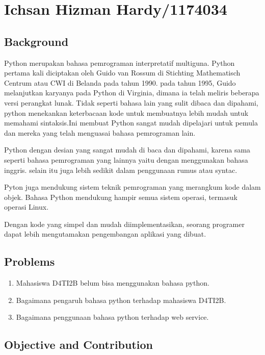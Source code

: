 \section{Ichsan Hizman Hardy/1174034}
\subsection{Background}
\par
Python merupakan bahasa pemrograman interpretatif multiguna. Python pertama kali diciptakan oleh Guido van Rossum di Stichting Mathematisch Centrum atau CWI di Belanda pada tahun 1990. pada tahun 1995, Guido melanjutkan karyanya pada Python di Virginia, dimana ia telah meliris beberapa versi perangkat lunak\cite{priyahita2015analisis}.
Tidak seperti bahasa lain yang sulit dibaca dan dipahami, python menekankan keterbacaan kode untuk membuatnya lebih mudah untuk memahami sintaksis\cite{cokelaer2013bioservices}.Ini membuat Python sangat mudah dipelajari untuk pemula dan mereka yang telah menguasai bahasa pemrograman lain.
\par
Python dengan desian yang sangat mudah di baca dan dipahami, karena sama seperti bahasa pemrograman yang lainnya yaitu dengan menggunakan bahasa inggris. selain itu juga lebih sedikit dalam penggunaan rumus atau syntac\cite{nur2018prototipe}.
\par
Pyton juga mendukung sistem teknik pemrograman yang merangkum kode dalam objek. Bahasa Python  mendukung hampir  semua sistem operasi, termasuk operasi Linux\cite{muzawi2018penerapan}.
\par
Dengan kode yang simpel dan mudah diimplementasikan, seorang programer dapat lebih mengutamakan pengembangan aplikasi yang dibuat.
	
\subsection{Problems}
\begin{enumerate}
	\item Mahasiswa D4TI2B belum bisa menggunakan bahasa python.
	\item Bagaimana pengaruh bahasa python terhadap mahasiswa D4TI2B.
	\item Bagaimana penggunaan bahasa python terhadap web service.
\end{enumerate}
	
\subsection{Objective and Contribution}
